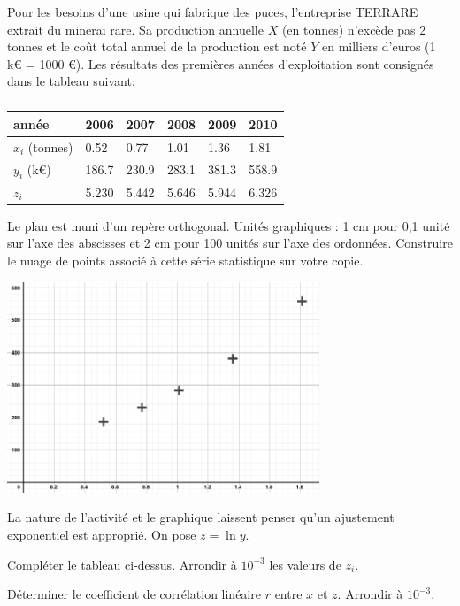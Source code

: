 \documentclass[a4paper,12pt]{scrartcl}
\begin{document}

Pour les besoins d'une usine qui fabrique des puces, l'entreprise TERRARE extrait du minerai rare. Sa production annuelle $X$ (en
tonnes) n'excède pas 2 tonnes et le coût total annuel de la production est noté $Y$ en milliers d'euros (1 k€ = 1000 €).
Les résultats des premières années d'exploitation sont consignés dans le tableau suivant:

\begin{table}[h]
\centering
\caption{}
\label{tableau_2}
\begin{tabular}{|l|l|l|l|l|l|}
\hline
année          & 2006  & 2007  & 2008  & 2009  & 2010  \\ \hline
$x_i$ (tonnes) & 0.52  & 0.77  & 1.01  & 1.36  & 1.81  \\ \hline
$y_i$ (k€)     & 186.7 & 230.9 & 283.1 & 381.3 & 558.9 \\ \hline
$z_i$&5.230&5.442&5.646&5.944&6.326 \\ \hline
\end{tabular}
\end{table}

\question{}
Le plan est muni d'un repère orthogonal.
Unités graphiques : 1 cm pour 0,1 unité sur l'axe des abscisses et 2 cm pour 100 unités sur l'axe des ordonnées.
Construire le nuage de points associé à cette série statistique sur votre copie. 

\begin{center}
\includegraphics[width=0.7\textwidth]{graph.png}
\end{center}

\question{}
La nature de l'activité et le graphique laissent penser qu'un ajustement exponentiel est approprié. On pose $z = \ln y$.

\subquestion{}
Compléter le tableau ci-dessus.
Arrondir à $10^{-3}$ les valeurs de $z_i$.

\subquestion{}
Déterminer le coefficient de corrélation linéaire $r$ entre $x$ et $z$. Arrondir à $10^{-3}$.
\end{document}
